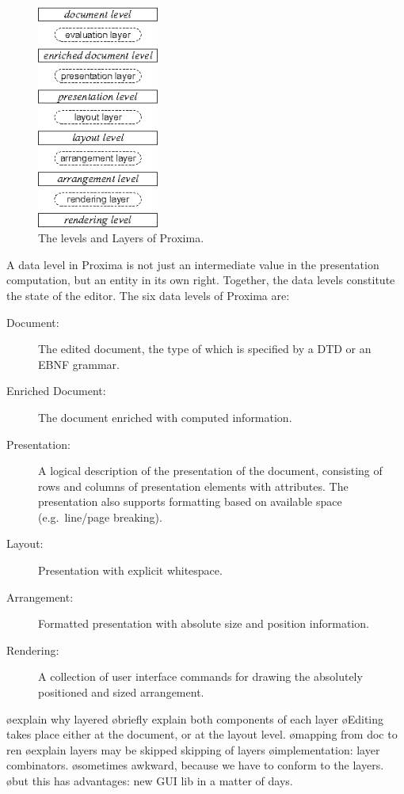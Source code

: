 \documentclass[12pt]{article}
\begin{document}
\begin{figure}[ht]
\centering
\includegraphics[width=4cm]{images/LevelLayerNames}
\caption{The levels and Layers of Proxima.}
\label{fig:levelsAndLayers}
\end{figure}

A data level in Proxima is not just an intermediate value in the presentation computation, but an entity in its own right. Together, the data levels constitute the state of the editor. The six data levels of Proxima are:


\begin{description}
\item[Document:] The edited document, the type of which is specified by a DTD or an EBNF grammar.

\item[Enriched Document:] The document enriched with computed information.

\item[Presentation:] A logical description of the presentation of the document, consisting of rows and columns of presentation elements with attributes. The presentation also supports formatting based on available space (e.g.\ line/page breaking).

\item[Layout:]  Presentation with explicit whitespace.

\item[Arrangement:] Formatted presentation with absolute size and position information.

\item[Rendering:] A collection of user interface commands for drawing the absolutely positioned and sized arrangement.
\end{description}



\bl
\o explain why layered
\o briefly explain both components of each layer
\o Editing takes place either at the document, or at the layout level.
\o mapping from doc to ren
\o explain layers may be skipped skipping of layers
\o implementation: layer combinators.
\o sometimes awkward, because we have to conform to the layers.
\o but this has advantages: new GUI lib in a matter of days.
\el
\end{document}
